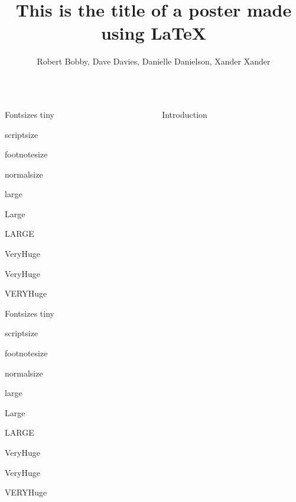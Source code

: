 \documentclass[final]{beamer}
\title{\huge This is the title of a poster made using \LaTeX{}}
\author[Dreuw et al.]{Robert Bobby, Dave Davies, Danielle Danielson, Xander Xander}
\institute[University of California, Berkeley]{Department of Nuclear Engineering}
\begin{document}
	\begin{frame}{}
    \maketitle
  		\begin{columns}[t]
    		\begin{column}{.3\linewidth}
    			\vfill
    			\begin{block}{\large Fontsizes}
      				\centering
      				{\tiny tiny}\par
      				{\scriptsize scriptsize}\par
      				{\footnotesize footnotesize}\par
      				{\normalsize normalsize}\par
      				{\large large}\par
      				{\Large Large}\par
      				{\LARGE LARGE}\par
      				{\veryHuge VeryHuge}\par
      				{\VeryHuge VeryHuge}\par
      				{\VERYHuge VERYHuge}\par
    			\end{block}
    	\vfill
    			\begin{block}{\large Fontsizes}
      				\centering
      				{\tiny tiny}\par
      				{\scriptsize scriptsize}\par
      				{\footnotesize footnotesize}\par
      				{\normalsize normalsize}\par
      				{\large large}\par
      				{\Large Large}\par
      				{\LARGE LARGE}\par
      				{\veryHuge VeryHuge}\par
      				{\VeryHuge VeryHuge}\par
      				{\VERYHuge VERYHuge}\par
    			\end{block}
    	\vfill
    	\end{column}
      	\begin{column}{.3\linewidth}
        	\begin{block}{Introduction}


\end{block}
\end{column}
\end{columns}
\end{frame}
\end{document}
